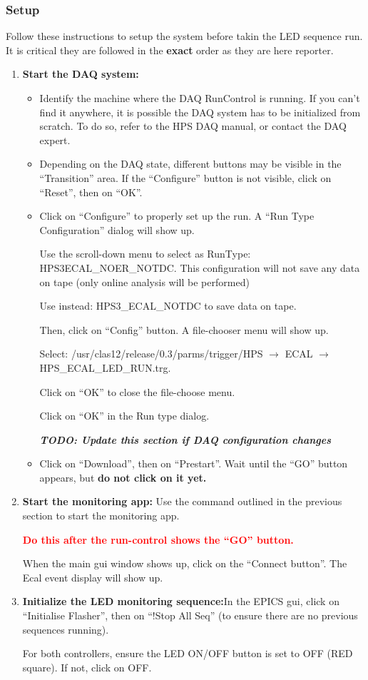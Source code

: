 \documentclass[12pt]{article}
\begin{document}
\subsubsection{Setup}
Follow these instructions to setup the system before takin the LED sequence run.
It is critical they are followed in the \textbf{exact} order as they are here reporter.

\begin{enumerate}
\item{\textbf{Start the DAQ system: }
\begin{itemize}
\item Identify the machine where the DAQ RunControl is running. If you can't find it anywhere, it is possible the DAQ system has to be initialized from scratch. To do so, refer to the HPS DAQ manual, or contact the DAQ expert.
\item Depending on the DAQ state, different buttons may be visible in the ``Transition'' area. If the ``Configure'' button is not visible, click on ``Reset'', then on ``OK''.
\item Click on ``Configure'' to properly set up the run.
A ``Run Type Configuration'' dialog will show up.

Use the scroll-down menu to select as RunType: HPS3ECAL\_NOER\_NOTDC. This configuration will not save any data on tape (only online analysis will be performed)

Use instead: HPS3\_ECAL\_NOTDC to save data on tape.

Then, click on ``Config'' button. A file-chooser menu will show up.

Select: /usr/clas12/release/0.3/parms/trigger/HPS $\rightarrow$ ECAL $\rightarrow$  HPS\_ECAL\_LED\_RUN.trg. 

Click on ``OK'' to close the file-choose menu.

Click on ``OK'' in the Run type dialog.

{\bf \it TODO: Update this section if DAQ configuration changes}

\item{Click on ``Download'', then on ``Prestart''.  Wait until the ``GO'' button appears, but {\bf do not click on it yet.}

 }
\end{itemize}
}
\item{\textbf{Start the monitoring app: }Use the command outlined in the previous section to start the monitoring app.

\textcolor{red}{\bf Do this after the run-control shows the ``GO'' button.}

When the main gui window shows up, click on the ``Connect button''. The Ecal event display will show up.}
\item{\textbf{Initialize the LED monitoring sequence:}In the EPICS gui, click on ``Initialise Flasher'', then on ``!Stop All Seq'' (to ensure there are no previous sequences running). 

For both controllers, ensure the LED ON/OFF button is set to OFF (RED square). If not, click on OFF.}
\end{enumerate}
      
\end{document}
